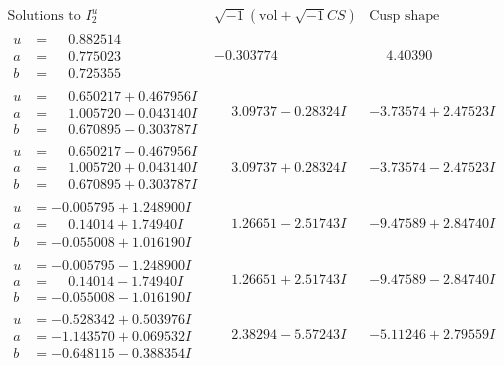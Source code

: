\documentclass[1p]{elsarticle_modified}
\theoremstyle{definition}
\newcommand{\I}{\sqrt{-1}}
\begin{document}
$$\begin{array}{c|c|c}  
\text{Solutions to }I^u_{2}& \I (\text{vol} + \sqrt{-1}CS) & \text{Cusp shape}\\
 \hline 
\begin{aligned}
u &= \phantom{-}0.882514\phantom{ +0.000000I} \\
a &= \phantom{-}0.775023\phantom{ +0.000000I} \\
b &= \phantom{-}0.725355\phantom{ +0.000000I}\end{aligned}
 & -0.303774\phantom{ +0.000000I} & \phantom{-}4.40390\phantom{ +0.000000I} \\ \hline\begin{aligned}
u &= \phantom{-}0.650217 + 0.467956 I \\
a &= \phantom{-}1.005720 - 0.043140 I \\
b &= \phantom{-}0.670895 - 0.303787 I\end{aligned}
 & \phantom{-}3.09737 - 0.28324 I & -3.73574 + 2.47523 I \\ \hline\begin{aligned}
u &= \phantom{-}0.650217 - 0.467956 I \\
a &= \phantom{-}1.005720 + 0.043140 I \\
b &= \phantom{-}0.670895 + 0.303787 I\end{aligned}
 & \phantom{-}3.09737 + 0.28324 I & -3.73574 - 2.47523 I \\ \hline\begin{aligned}
u &= -0.005795 + 1.248900 I \\
a &= \phantom{-}0.14014 + 1.74940 I \\
b &= -0.055008 + 1.016190 I\end{aligned}
 & \phantom{-}1.26651 - 2.51743 I & -9.47589 + 2.84740 I \\ \hline\begin{aligned}
u &= -0.005795 - 1.248900 I \\
a &= \phantom{-}0.14014 - 1.74940 I \\
b &= -0.055008 - 1.016190 I\end{aligned}
 & \phantom{-}1.26651 + 2.51743 I & -9.47589 - 2.84740 I \\ \hline\begin{aligned}
u &= -0.528342 + 0.503976 I \\
a &= -1.143570 + 0.069532 I \\
b &= -0.648115 - 0.388354 I\end{aligned}
 & \phantom{-}2.38294 - 5.57243 I & -5.11246 + 2.79559 I \\ \hline\begin{aligned}

\end{aligned}
\end{array}$$
\end{document}
